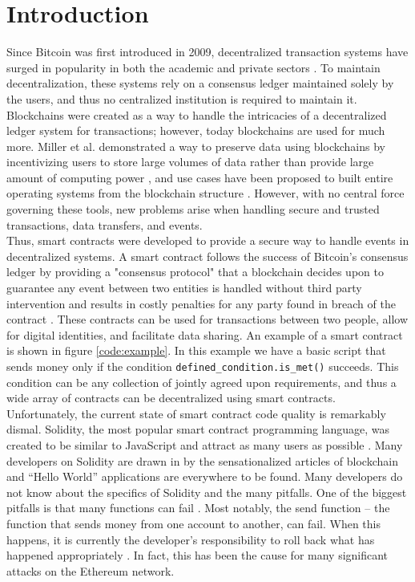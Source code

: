 \section{Introduction}

Since Bitcoin was first introduced in 2009, decentralized transaction systems have surged in popularity in both the academic and private sectors \cite{nakamoto2008bitcoin}. To maintain decentralization, these systems rely on a consensus ledger maintained solely by the users, and thus no centralized institution is required to maintain it. Blockchains were created as a way to handle the intricacies of a decentralized ledger system for transactions; however, today blockchains are used for much more. Miller et al. demonstrated a way to preserve data using blockchains by incentivizing users to store large volumes of data rather than provide large amount of computing power \cite{miller2014permacoin}, and use cases have been proposed to built entire operating systems from the blockchain structure \cite{factombos,tapscott2016blockchain}. However, with no central force governing these tools, new problems arise when handling secure and trusted transactions, data transfers, and events. \\

Thus, smart contracts were developed to provide a secure way to handle events in decentralized systems. A smart contract follows the success of Bitcoin's consensus ledger by providing a "consensus protocol" that a blockchain decides upon to guarantee any event between two entities is handled without third party intervention and results in costly penalties for any party found in breach of the contract \cite{szabo1997idea, luu2016making,daian2016dao}. These contracts can be used for transactions between two people, allow for digital identities, and facilitate data sharing. An example of a smart contract is shown in figure \ref{code:example}. In this example we have a basic script that sends money only if the condition \texttt{defined\_condition.is\_met()} succeeds. This condition can be any collection of jointly agreed upon requirements, and thus a wide array of contracts can be decentralized using smart contracts. \\

Unfortunately, the current state of smart contract code quality is remarkably dismal. Solidity, the most popular smart contract programming language, was created to be similar to JavaScript and attract as many users as possible \cite{bartolettipompianuanalysis, systematicstudy}. Many developers on Solidity are drawn in by the sensationalized articles of blockchain and ``Hello World'' applications are everywhere to be found. Many developers do not know about the specifics of Solidity and the many pitfalls. One of the biggest pitfalls is that many functions can fail \cite{systematicstudy}. Most notably, the send function -- the function that sends money from one account to another, can fail. When this happens, it is currently the developer's responsibility to roll back what has happened appropriately \cite{luu2016making}. In fact, this has been the cause for many significant attacks on the Ethereum network. \\

